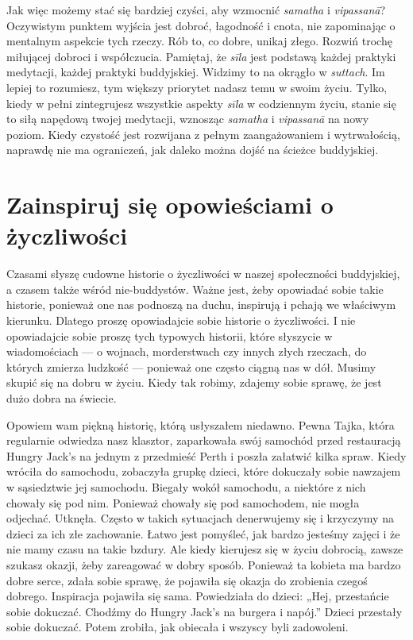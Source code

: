 \documentclass[12pt,openany]{book}
\begin{document}
Jak więc możemy stać się bardziej czyści, aby wzmocnić \textit{samatha} i \textit{vipassanā}? Oczywistym punktem wyjścia jest dobroć, łagodność i cnota, nie zapominając o mentalnym aspekcie tych rzeczy. Rób to, co dobre, unikaj złego. Rozwiń trochę miłującej dobroci i współczucia. Pamiętaj, że \textit{sīla} jest podstawą każdej praktyki medytacji, każdej praktyki buddyjskiej. Widzimy to na okrągło w \textit{suttach}. Im lepiej to rozumiesz, tym większy priorytet nadasz temu w swoim życiu. Tylko, kiedy w pełni zintegrujesz wszystkie aspekty \textit{sīla} w codziennym życiu, stanie się to siłą napędową twojej medytacji, wznosząc \textit{samatha} i \textit{vipassanā} na nowy poziom. Kiedy czystość jest rozwijana z pełnym zaangażowaniem i wytrwałością, naprawdę nie ma ograniczeń, jak daleko można dojść na ścieżce buddyjskiej.

\section*{Zainspiruj się opowieściami o życzliwości}

Czasami słyszę cudowne historie o życzliwości w naszej społeczności buddyjskiej, a czasem także wśród nie-buddystów. Ważne jest, żeby opowiadać sobie takie historie, ponieważ one nas podnoszą na duchu, inspirują i pchają we właściwym kierunku. Dlatego proszę opowiadajcie sobie historie o życzliwości. I nie opowiadajcie sobie proszę tych typowych historii, które słyszycie w wiadomościach --- o wojnach, morderstwach czy innych złych rzeczach, do których zmierza ludzkość --- ponieważ one często ciągną nas w dół. Musimy skupić się na dobru w życiu. Kiedy tak robimy, zdajemy sobie sprawę, że jest dużo dobra na świecie.

Opowiem wam piękną historię, którą usłyszałem niedawno. Pewna Tajka, która regularnie odwiedza nasz klasztor, zaparkowała swój samochód przed restauracją Hungry Jack’s na jednym z przedmieść Perth i poszła załatwić kilka spraw. Kiedy wróciła do samochodu, zobaczyła grupkę dzieci, które dokuczały sobie nawzajem w sąsiedztwie jej samochodu. Biegały wokół samochodu, a niektóre z nich chowały się pod nim. Ponieważ chowały się pod samochodem, nie mogła odjechać. Utknęła. Często w takich sytuacjach denerwujemy się i krzyczymy na dzieci za ich złe zachowanie. Łatwo jest pomyśleć, jak bardzo jesteśmy zajęci i że nie mamy czasu na takie bzdury. Ale kiedy kierujesz się w życiu dobrocią, zawsze szukasz okazji, żeby zareagować w dobry sposób. Ponieważ ta kobieta ma bardzo dobre serce, zdała sobie sprawę, że pojawiła się okazja do zrobienia czegoś dobrego. Inspiracja pojawiła się sama. Powiedziała do dzieci: „Hej, przestańcie sobie dokuczać. Chodźmy do Hungry Jack’s na burgera i napój.” Dzieci przestały sobie dokuczać. Potem zrobiła, jak obiecała i wszyscy byli zadowoleni.
\end{document}
